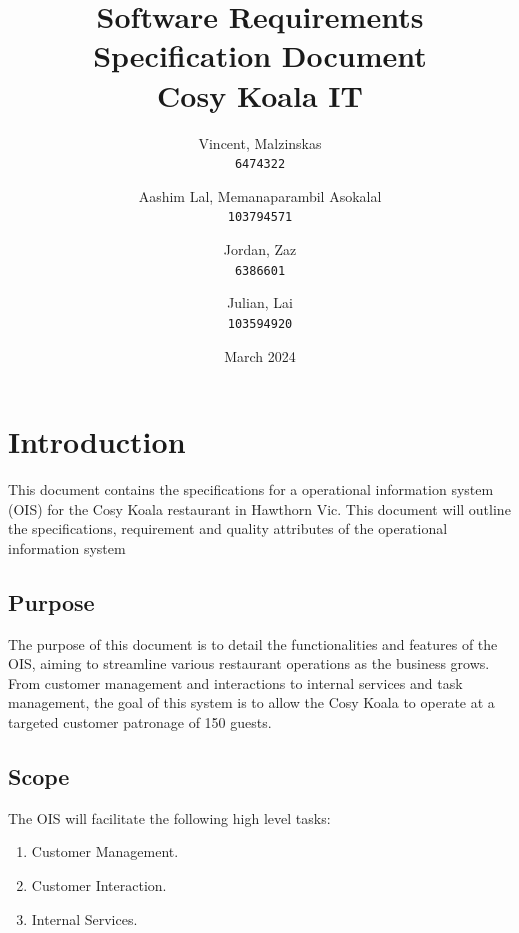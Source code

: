 \documentclass{article}
\title{Software Requirements Specification
Document\\
Cosy Koala IT}
\author{
  Vincent, Malzinskas\\
  \texttt{6474322}
  \and
  Aashim Lal, Memanaparambil Asokalal\\
  \texttt{103794571}
  \and
  Jordan, Zaz\\
  \texttt{6386601}
  \and
  Julian, Lai\\
  \texttt{103594920}
}
\date{March 2024}
\begin{document}
\maketitle
\newpage
\tableofcontents
\newpage


\section{Introduction}
This document contains the specifications for a operational information system (OIS) for the Cosy Koala restaurant in Hawthorn Vic. This document will outline the specifications, requirement and quality attributes of the operational information system

\subsection{Purpose}
The purpose of this document is to detail the functionalities and features of the OIS, aiming to streamline various restaurant operations as the business grows. From customer management and interactions to internal services and task management, the goal of this system is to allow the Cosy Koala to operate at a targeted customer patronage of 150 guests.

\subsection{Scope}
The OIS will facilitate the following high level tasks:
\begin{enumerate}
    \item Customer Management.
    \item Customer Interaction.
    \item Internal Services.
\end{enumerate}
\end{document}
